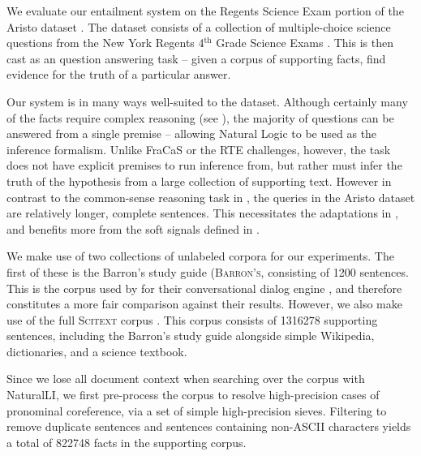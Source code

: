 %
%
We evaluate our entailment system on the Regents Science Exam portion of
  the Aristo dataset \cite{key:2013clark-aristo,key:2015clark-aristo}.
The dataset consists of a collection of multiple-choice science questions
  from the New York Regents 4$^{\textrm{th}}$ Grade Science Exams
  \cite{key:NYSED}.
This is then cast as an question answering task -- given a corpus of
  supporting facts, find evidence for the truth of a particular answer.

Our system is in many ways well-suited to the dataset.
Although certainly many of the facts require complex reasoning
  (see ), the majority of questions can be
  answered from a single premise -- allowing Natural Logic to be used
  as the inference formalism.
Unlike FraCaS or the RTE challenges, however, the task does not have explicit
  premises to run inference from, but rather must infer the truth of the
  hypothesis from a large collection of supporting text.
However in contrast to the common-sense reasoning task in ,
  the queries in the Aristo dataset are relatively longer, complete sentences.
This necessitates the adaptations in , 
  and benefits more from the
  soft signals defined in .

We make use of two collections of unlabeled corpora for our experiments.
The first of these is the Barron's study guide (\textsc{Barron's}, 
  consisting of \num{1200} sentences.
This is the corpus used by  for their conversational
  dialog engine \knowbot, and therefore constitutes a more fair comparison against 
  their results.
However, we also make use of the full \textsc{Scitext} corpus \cite{key:2014clark-aristo}.
This corpus consists of \num{1316278} supporting sentences, 
  including the Barron's study guide alongside 
  simple Wikipedia, dictionaries, and a science textbook.

Since we lose all document context when searching over the corpus with NaturalLI,
  we first pre-process the corpus to resolve high-precision cases of
  pronominal coreference, via a set of simple high-precision sieves.
Filtering to remove duplicate sentences and sentences containing
    non-ASCII characters yields a total of \num{822748} facts in the supporting corpus.


